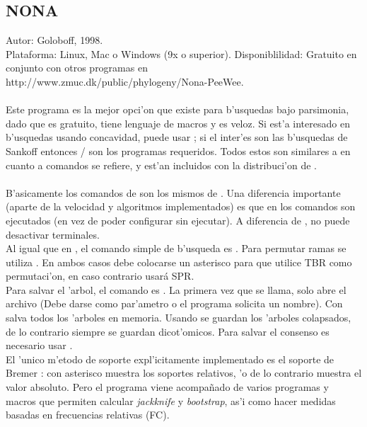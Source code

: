 \subsection{NONA}
\noindent
Autor: Goloboff, 1998.\\
Plataforma: Linux, Mac o Windows (9x o superior).
Disponiblilidad: Gratuito en conjunto con otros programas en\\
http://www.zmuc.dk/public/phylogeny/Nona-PeeWee.
\\
\paragraph*{}
Este programa es la mejor opci'on que existe para b'usquedas bajo parsimonia, dado que es gratuito, tiene lenguaje de macros y es veloz. Si est'a interesado en b'usquedas usando concavidad, puede usar ; si el inter'es son las b'usquedas de Sankoff entonces / son los programas requeridos. Todos estos son similares a  en cuanto a comandos se refiere, y est'an incluidos con la distribuci'on de .
\paragraph*{}
B'asicamente los comandos de  son los mismos de . Una diferencia importante (aparte de la velocidad y algoritmos implementados) es que en  los comandos son ejecutados (en vez de poder configurar sin ejecutar). A diferencia de , no puede desactivar terminales.\\
Al igual que en , el comando simple de b'usqueda es . Para permutar ramas se utiliza . En ambos casos debe colocarse un asterisco  para que utilice TBR como permutaci'on, en caso contrario usar\'a SPR.\\
Para salvar el 'arbol, el comando es . La primera vez que se llama, solo abre el archivo (Debe darse como par'ametro o el programa solicita un nombre). Con  salva todos los 'arboles en memoria. Usando  se guardan los 'arboles colapsados, de lo contrario siempre se guardan dicot'omicos. Para salvar el consenso es necesario usar .\\
El 'unico m'etodo de soporte expl'icitamente implementado es el soporte de Bremer : con asterisco  muestra los soportes relativos, 'o de lo contrario muestra el valor absoluto. Pero el programa viene acompa\~nado de varios programas y macros que permiten calcular \textit{jackknife} y \textit{bootstrap}, as'i como hacer medidas basadas en frecuencias relativas (FC).
